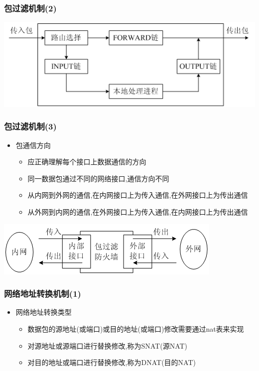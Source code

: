 \documentclass[xcolor=svgnames,presentation]{beamer}
\begin{document}
\begin{frame}
\frametitle{包过滤机制(2)}
\label{sec-2-8}
\label{sec-2-8-1}

\includegraphics[width=.9\linewidth]{img/iptables3.png}
\end{frame}
\begin{frame}
\frametitle{包过滤机制(3)}
\label{sec-2-9}
\begin{itemize}

\item 包通信方向
\label{sec-2-9-1}%
\begin{itemize}

\item 应正确理解每个接口上数据通信的方向
\label{sec-2-9-1-1}%

\item 同一数据包通过不同的网络接口,通信方向不同
\label{sec-2-9-1-2}%

\item 从内网到外网的通信,在内网接口上为传入通信,在外网接口上为传出通信
\label{sec-2-9-1-3}%

\item 从外网到内网的通信,在外网接口上为传入通信,在内网接口上为传出通信
\label{sec-2-9-1-4}%
\end{itemize} %
\end{itemize} %
\label{sec-2-9-2}

\includegraphics[width=.9\linewidth]{img/iptables4.png}
\end{frame}
\begin{frame}
\frametitle{网络地址转换机制(1)}
\label{sec-2-10}
\begin{itemize}

\item 网络地址转换类型
\label{sec-2-10-1}%
\begin{itemize}

\item 数据包的源地址(或端口)或目的地址(或端口)修改需要通过nat表来实现
\label{sec-2-10-1-1}%

\item 对源地址或源端口进行替换修改,称为SNAT(源NAT)
\label{sec-2-10-1-2}%

\item 对目的地址或端口进行替换修改,称为DNAT(目的NAT)
\label{sec-2-10-1-3}%
\end{itemize} %
\end{itemize} %
\end{frame}
\end{document}
